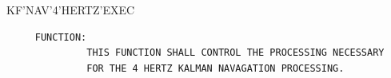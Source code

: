 \begin{frame}
KF'NAV'4'HERTZ'EXEC
\begin{verbatim}
     FUNCTION:
              THIS FUNCTION SHALL CONTROL THE PROCESSING NECESSARY
              FOR THE 4 HERTZ KALMAN NAVAGATION PROCESSING.

\end{verbatim}
\end{frame}

